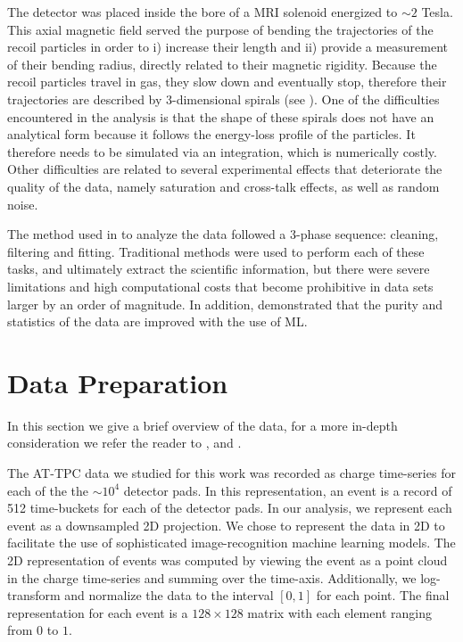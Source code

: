 \documentclass[review,number,sort&compress]{elsarticle}
\begin{document}
The detector was placed inside the bore of a MRI solenoid energized to $\sim 2$ Tesla. This axial magnetic field served the purpose of bending the trajectories of the recoil particles in order to i) increase their length and ii) provide a measurement of their bending radius, directly related to their magnetic rigidity. Because the recoil particles travel in gas, they slow down and eventually stop, therefore their trajectories are described by 3-dimensional spirals (see \cite{Bradt2017}). One of the difficulties encountered in the analysis is that the shape of these spirals does not have an analytical form because it follows the energy-loss profile of the particles. It therefore needs to be simulated via an integration, which is numerically costly. Other difficulties are related to several experimental effects that deteriorate the quality of the data, namely saturation and cross-talk effects, as well as random noise. 

The method used in \cite{Bradt2018} to analyze the data followed a 3-phase sequence: cleaning, filtering and fitting. Traditional methods were used to perform each of these tasks, and ultimately extract the scientific information, but there were severe limitations and high computational costs that become prohibitive in data sets larger by an order of magnitude. In addition, \cite{Kuchera2019} demonstrated that the purity and statistics of the data are improved with the use of ML.


\section{Data Preparation}

In this section we give a brief overview of the data, for a more in-depth consideration we refer the reader to \cite{Mittig2015}, \cite{Suzuki2012} and  \cite{Bradt2017a}. 

The AT-TPC data we studied for this work was recorded as charge time-series for each of the  the $\sim10^4$ detector pads.
In this representation, an event is a record of 512 time-buckets for each of the detector pads. In our analysis, we represent each event as a downsampled 2D projection.
We chose to represent the data in 2D to facilitate the use of sophisticated image-recognition machine learning models.
The 2D representation of events was computed by viewing the event as a point cloud in the charge time-series and summing over the time-axis.
Additionally, we log-transform and normalize the data to the interval $[0, 1]$ for each point. The final representation for each event is a $128 \times 128$ matrix with each element ranging from $0$ to $1$.
\end{document}
